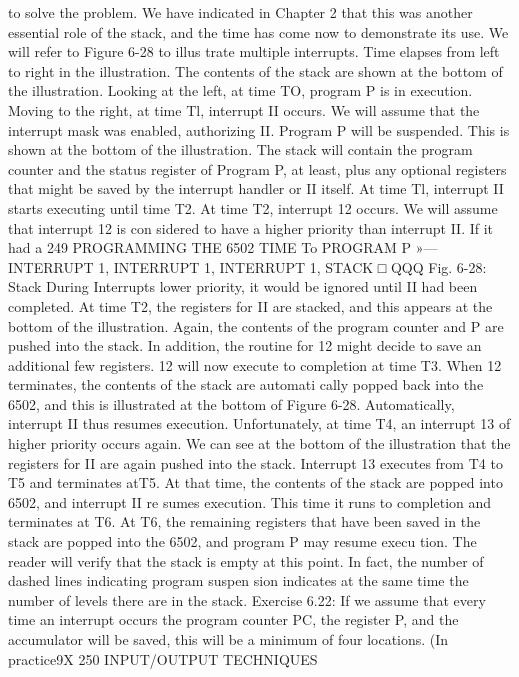 \documentclass{book}
\begin{document}
to solve the problem. We have indicated in Chapter 2 that this
was another essential role of the stack, and the time has come
now to demonstrate its use. We will refer to Figure 6-28 to illus
trate multiple interrupts. Time elapses from left to right in the
illustration. The contents of the stack are shown at the bottom of
the illustration. Looking at the left, at time TO, program P is in
execution. Moving to the right, at time Tl, interrupt II occurs. We
will assume that the interrupt mask was enabled, authorizing II.
Program P will be suspended. This is shown at the bottom of the
illustration. The stack will contain the program counter and the
status register of Program P, at least, plus any optional registers
that might be saved by the interrupt handler or II itself.
At time Tl, interrupt II starts executing until time T2. At time
T2, interrupt 12 occurs. We will assume that interrupt 12 is con
sidered to have a higher priority than interrupt II. If it had a
249
PROGRAMMING THE 6502
TIME To
PROGRAM P »—
INTERRUPT 1,
INTERRUPT 1,
INTERRUPT 1,
STACK □ QQQ
Fig. 6-28: Stack During Interrupts
lower priority, it would be ignored until II had been completed. At
time T2, the registers for II are stacked, and this appears at the
bottom of the illustration. Again, the contents of the program
counter and P are pushed into the stack. In addition, the routine
for 12 might decide to save an additional few registers. 12 will now
execute to completion at time T3.
When 12 terminates, the contents of the stack are automati
cally popped back into the 6502, and this is illustrated at the
bottom of Figure 6-28. Automatically, interrupt II thus resumes
execution. Unfortunately, at time T4, an interrupt 13 of higher
priority occurs again. We can see at the bottom of the illustration
that the registers for II are again pushed into the stack. Interrupt
13 executes from T4 to T5 and terminates atT5. At that time, the
contents of the stack are popped into 6502, and interrupt II re
sumes execution. This time it runs to completion and terminates
at T6. At T6, the remaining registers that have been saved in the
stack are popped into the 6502, and program P may resume execu
tion. The reader will verify that the stack is empty at this point.
In fact, the number of dashed lines indicating program suspen
sion indicates at the same time the number of levels there are in the
stack.
Exercise 6.22: If we assume that every time an interrupt occurs
the program counter PC, the register P, and the accumulator will
be saved, this will be a minimum of four locations. (In practice9X
250
INPUT/OUTPUT TECHNIQUES
\end{document}
